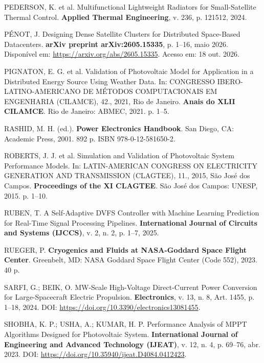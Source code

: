 \vspace{0.2cm}
\noindent PEDERSON, K. et al. Multifunctional Lightweight Radiators for Small-Satellite Thermal Control. \textbf{Applied Thermal Engineering}, v. 236, p. 121512, 2024.

\vspace{0.2cm}
\noindent PÉNOT, J. Designing Dense Satellite Clusters for Distributed Space-Based Datacenters. \textbf{arXiv preprint arXiv:2605.15335}, p. 1--16, maio 2026. Disponível em: \url{https://arxiv.org/abs/2605.15335}. Acesso em: 18 out. 2026.

\vspace{0.2cm}
\noindent PIGNATON, E. G. et al. Validation of Photovoltaic Model for Application in a Distributed Energy Source Using Weather Data. In: CONGRESSO IBERO-LATINO-AMERICANO DE MÉTODOS COMPUTACIONAIS EM ENGENHARIA (CILAMCE), 42., 2021, Rio de Janeiro. \textbf{Anais do XLII CILAMCE}. Rio de Janeiro: ABMEC, 2021. p. 1--5.

\vspace{0.2cm}
\noindent RASHID, M. H. (ed.). \textbf{Power Electronics Handbook}. San Diego, CA: Academic Press, 2001. 892 p. ISBN 978-0-12-581650-2.

\vspace{0.2cm}
\noindent ROBERTS, J. J. et al. Simulation and Validation of Photovoltaic System Performance Models. In: LATIN-AMERICAN CONGRESS ON ELECTRICITY GENERATION AND TRANSMISSION (CLAGTEE), 11., 2015, São José dos Campos. \textbf{Proceedings of the XI CLAGTEE}. São José dos Campos: UNESP, 2015. p. 1--10.

\vspace{0.2cm}
\noindent RUBEN, T. A Self-Adaptive DVFS Controller with Machine Learning Prediction for Real-Time Signal Processing Pipelines. \textbf{International Journal of Circuits and Systems (IJCCS)}, v. 2, n. 2, p. 1--7, 2025.

\vspace{0.2cm}
\noindent RUEGER, P. \textbf{Cryogenics and Fluids at NASA-Goddard Space Flight Center}. Greenbelt, MD: NASA Goddard Space Flight Center (Code 552), 2023. 40 p.

\vspace{0.2cm}
\noindent SARFI, G.; BEIK, O. MW-Scale High-Voltage Direct-Current Power Conversion for Large-Spacecraft Electric Propulsion. \textbf{Electronics}, v. 13, n. 8, Art. 1455, p. 1--18, 2024. DOI: \url{https://doi.org/10.3390/electronics13081455}.

\vspace{0.2cm}
\noindent SHOBHA, K. P.; USHA, A.; KUMAR, H. P. Performance Analysis of MPPT Algorithms Designed for Photovoltaic System. \textbf{International Journal of Engineering and Advanced Technology (IJEAT)}, v. 12, n. 4, p. 69--76, abr. 2023. DOI: \url{https://doi.org/10.35940/ijeat.D4084.0412423}.

